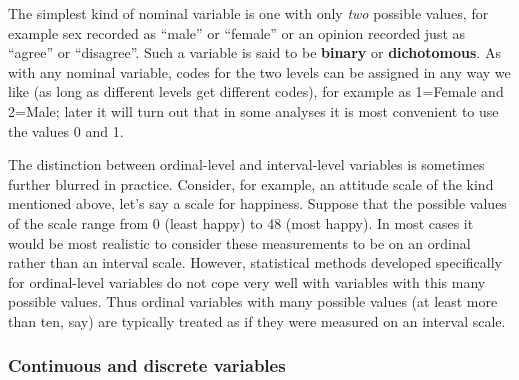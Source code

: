 The simplest kind of nominal variable is one with only \emph{two}
possible values, for example sex recorded as ``male'' or ``female'' or
an opinion recorded just as ``agree'' or ``disagree''. Such a variable
is said to be \textbf{binary} or \textbf{dichotomous}. As with any
nominal variable, codes for the two levels can be assigned in any way we
like (as long as different levels get different codes), for example as
1=Female and 2=Male; later it will turn out that in some analyses it is
most convenient to use the values 0 and 1.

The distinction between ordinal-level and interval-level variables
is sometimes further blurred in practice. Consider, for example, an
attitude scale of the kind mentioned above, let's say a scale for
happiness. Suppose that the possible values of the scale range from 0
(least happy) to 48 (most happy). In most cases it would be most
realistic to consider these measurements to be on an ordinal rather than
an interval scale. However, statistical methods developed specifically
for ordinal-level variables do not cope very well with variables with
this many possible values. Thus ordinal variables with many possible
values (at least more than ten, say) are typically treated as if they
were measured on an interval scale.


\subsubsection{Continuous and discrete variables}
\label{sss_intro_def_vars_cont}

